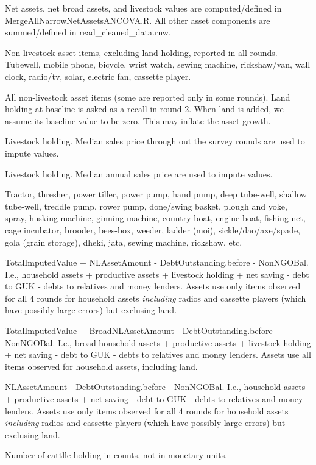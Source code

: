 Net assets, net broad assets, and livestock values are computed/defined in \textsf{MergeAllNarrowNetAssetsANCOVA.R}. All other asset components are summed/defined in \textsf{read\_cleaned\_data.rnw}. 
\begin{description}
\vspace{1.0ex}\setlength{\itemsep}{1.0ex}\setlength{\baselineskip}{12pt}
\item[Household assets]	Non-livestock asset items, excluding land holding, reported in all rounds. Tubewell, mobile phone, bicycle, wrist watch, sewing machine, rickshaw/van, wall clock, radio/tv, solar, electric fan, cassette player.
\item[Broad household assets]	All non-livestock asset items (some are reported only in some rounds). Land holding at baseline is asked as a recall in round 2. When land is added, we assume its baseline value to be zero. This may inflate the asset growth.
\item[Total imputed value of livestock]	Livestock holding. Median sales price through out the survey rounds are used to impute values.
\item[Total imputed 2 value of livestock]	Livestock holding. Median annual sales price are used to impute values.
\item[Productive assets]	Tractor, thresher, power tiller, power pump, hand pump, deep tube-well, shallow tube-well, treddle pump, rower pump, done/swing basket, plough and yoke, spray, husking machine, ginning machine, country boat, engine boat, fishing net, cage incubator, brooder, bees-box, weeder, ladder (moi), sickle/dao/axe/spade, gola (grain storage), dheki, jata, sewing machine, rickshaw, etc.
\item[Net assets]	TotalImputedValue + NLAssetAmount - DebtOutstanding.before - NonNGOBal. I.e., household assets + productive assets + livestock holding + net saving - debt to GUK - debts to relatives and money lenders. Assets use only items observed for all 4 rounds for household assets \textit{including} radios and cassette players (which have possibly large errors) but exclusing land. 
\item[Net broad assets]	TotalImputedValue + BroadNLAssetAmount - DebtOutstanding.before - NonNGOBal. I.e., broad household assets + productive assets + livestock holding + net saving - debt to GUK - debts to relatives and money lenders. Assets use all items observed for household assets, including land. 
\item[Net non-livestock assets]	 NLAssetAmount - DebtOutstanding.before - NonNGOBal. I.e., household assets + productive assets + net saving - debt to GUK - debts to relatives and money lenders. Assets use only items observed for all 4 rounds for household assets \textit{including} radios and cassette players (which have possibly large errors) but exclusing land. 
\item[Cattle holding]	Number of cattlle holding in counts, not in monetary units. 
\end{description}


